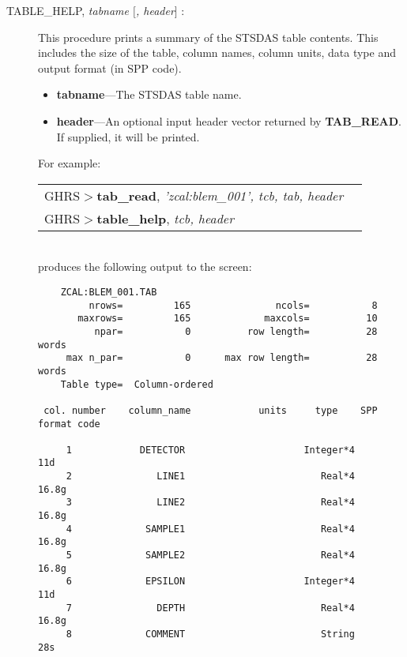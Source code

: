 \begin{description}

\item [TABLE\_HELP, {\it tabname $[$, header$]$} :]


This 
procedure prints a summary of the STSDAS table contents. This includes the size of the 
table, column names, column units, data type and output format (in SPP code).

\begin{itemize}

\item {\bf tabname}---The STSDAS table name.

\item {\bf header}---An optional input header vector returned by {\bf
TAB\_READ}.  If supplied, it will be printed. 

\end{itemize}

\noindent
For example:\\

\begin{tabular}{ll}
GHRS$>${\bf tab\_read}, {\it 'zcal:blem\_001', tcb, tab, header} & \\
GHRS$>${\bf table\_help}, {\it tcb, header} & \\
\end{tabular}\\

\noindent
produces the following output to the screen:

\begin{scriptsize}
\begin{center}
\begin{verbatim}
	ZCAL:BLEM_001.TAB                                               
         nrows=         165               ncols=           8
       maxrows=         165             maxcols=          10
          npar=           0          row length=          28 words
     max n_par=           0      max row length=          28 words
    Table type=  Column-ordered
 
 col. number    column_name            units     type    SPP format code
 
     1            DETECTOR                     Integer*4       11d
     2               LINE1                        Real*4     16.8g
     3               LINE2                        Real*4     16.8g
     4             SAMPLE1                        Real*4     16.8g
     5             SAMPLE2                        Real*4     16.8g
     6             EPSILON                     Integer*4       11d
     7               DEPTH                        Real*4     16.8g
     8             COMMENT                        String       28s
 

\end{verbatim}
\end{center}
\end{scriptsize}
\end{description}
